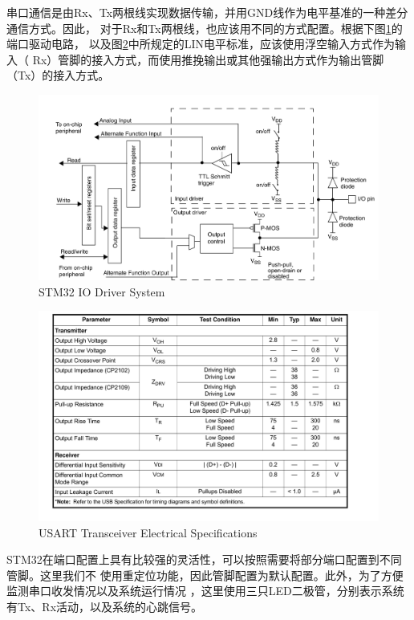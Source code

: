 \documentclass[a4paper]{ctexart}
\begin{document}
串口通信是由Rx、Tx两根线实现数据传输，并用GND线作为电平基准的一种差分通信方式。因此，
对于Rx和Tx两根线，也应该用不同的方式配置。根据下图\ref{stm32iodriver}的端口驱动电路，
以及图\ref{iso7816usartspecific}中所规定的LIN电平标准，应该使用浮空输入方式作为输入（
Rx）管脚的接入方式，而使用推挽输出或其他强输出方式作为输出管脚（Tx）的接入方式。
\begin{figure}[h]
  \centering\includegraphics[width=\textwidth]{./img/ioport.png}
  \caption{STM32 IO Driver System}\label{stm32iodriver}
\end{figure}
\begin{figure}[h]
  \centering\includegraphics[width=\textwidth]{./img/usartvolt.png}
  \caption{USART Transceiver Electrical Specifications}\label{iso7816usartspecific}
\end{figure}

STM32在端口配置上具有比较强的灵活性，可以按照需要将部分端口配置到不同管脚。这里我们不
使用重定位功能，因此管脚配置为默认配置。此外，为了方便监测串口收发情况以及系统运行情况
，这里使用三只LED二极管，分别表示系统有Tx、Rx活动，以及系统的心跳信号。
\end{document}
